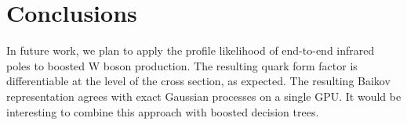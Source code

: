 \section{Conclusions}\label{sec:conclusions}

In future work, we plan to apply the profile likelihood of end-to-end
infrared poles to boosted W boson production. The resulting quark form
factor is differentiable at the level of the cross section, as expected.
The resulting Baikov representation agrees with exact Gaussian processes
on a single GPU. It would be interesting to combine this approach with
boosted decision trees.

